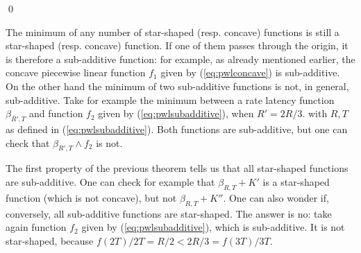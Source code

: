 %
%
%
\qed

The minimum of any number of star-shaped (resp. concave) functions
is still a star-shaped (resp. concave) function. If one of them
passes through the origin, it is therefore a sub-additive
function: for example, as already mentioned earlier, the concave
piecewise linear function $f_1$ given by (\ref{eq:pwlconcave}) is
sub-additive. On the other hand the minimum of two sub-additive
functions is not, in general, sub-additive. Take for example the
minimum between a rate latency function $\beta_{R',T}$ and
function $f_2$ given by (\ref{eq:pwlsubadditive}), when $R' =
2R/3$. with $R, T$ as defined in (\ref{eq:pwlsubadditive}).
 Both functions are sub-additive, but one can check that $\beta_{R',T} \wedge f_2$ is not.

The first property of the previous theorem tells us that all
star-shaped functions are sub-additive. One can check for example
that $\beta_{R,T} + K'$ is a star-shaped function (which is not
concave), but not $\beta_{R,T} + K''$. One can also wonder if,
conversely, all sub-additive functions are star-shaped. The answer
is no: take again
 function $f_2$ given by (\ref{eq:pwlsubadditive}), which is sub-additive. It is not star-shaped, because
$f(2T)/2T = R/2 < 2R/3 = f(3T)/3T$.
